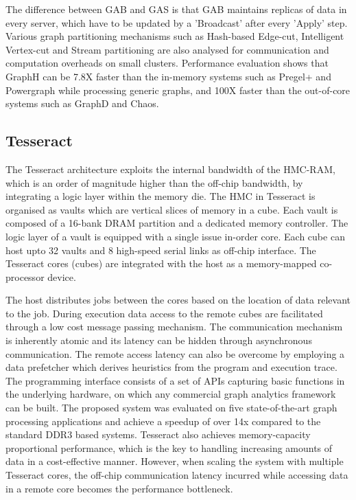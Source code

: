 The difference between GAB and GAS is that GAB maintains replicas of data in every server, which have to be updated by a 'Broadcast' after every 'Apply' step. Various graph partitioning mechanisms such as Hash-based Edge-cut, Intelligent Vertex-cut and Stream partitioning are also analysed for communication and computation overheads on small clusters. Performance evaluation shows that GraphH can be 7.8X faster than the in-memory systems such as Pregel+ and Powergraph while processing generic graphs, and 100X faster than the out-of-core systems such as GraphD and Chaos.

 
 \subsection{Tesseract} The Tesseract architecture \cite{Tesseract} exploits the internal bandwidth of the HMC-RAM, which is an order of magnitude higher than the off-chip bandwidth, by integrating a logic layer within the memory die. The HMC in Tesseract is organised as vaults which are vertical slices of memory in a cube. Each vault is composed of a 16-bank DRAM partition and a dedicated memory controller. The logic layer of a vault is equipped with a single issue in-order core. Each cube can host upto 32 vaults and 8 high-speed serial links as off-chip interface. The Tesseract cores (cubes) are integrated with the host as a memory-mapped co-processor device.
 
 The host distributes jobs between the cores based on the location of data relevant to the job. During execution data access to the remote cubes are facilitated through a low cost message passing mechanism. The communication mechanism is inherently atomic and its latency can be hidden through asynchronous communication. The remote access latency can also be overcome by employing a data prefetcher which derives heuristics from the program and execution trace. The programming interface consists of a set of APIs capturing basic functions in the underlying hardware, on which any commercial graph analytics framework can be built. The proposed system was evaluated on five state-of-the-art graph processing applications and achieve a speedup of over 14x compared to the standard DDR3 based systems. Tesseract also achieves memory-capacity proportional performance, which is the key to handling increasing amounts of data in a cost-effective manner. However, when scaling the system with multiple Tesseract cores, the off-chip communication latency incurred while accessing data in a remote core becomes the performance bottleneck.
 
